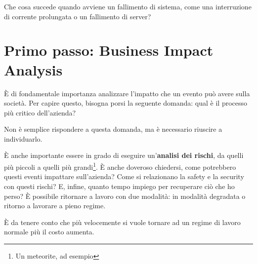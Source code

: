 Che cosa succede quando avviene un fallimento di sistema, come una interruzione
di corrente prolungata o un fallimento di server?

\section{Primo passo: Business Impact Analysis}

È di fondamentale importanza analizzare l'impatto che un evento può avere sulla
società. Per capire questo, bisogna porsi la seguente domanda: qual è il
processo più critico dell'azienda?

Non è semplice rispondere a questa domanda, ma è necessario riuscire a
individuarlo.

È anche importante essere in grado di eseguire un'\textbf{analisi dei rischi},
da quelli più piccoli a quelli più grandi\footnote{Un meteorite, ad esempio}. È
anche doveroso chiedersi, come potrebbero questi eventi impattare sull'azienda?
Come si relazionano la safety e la security con questi rischi? E, infine,
quanto tempo impiego per recuperare ciò che ho perso? È possibile ritornare a
lavoro con due modalità: in modalità degradata o ritorno a lavorare a pieno 
regime.

È da tenere conto che più velocemente si vuole tornare ad un regime di lavoro
normale più il costo aumenta.
